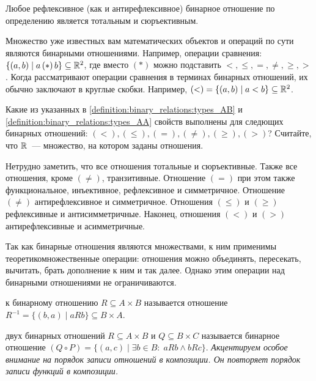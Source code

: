 \begin{remark}
    Любое рефлексивное (как и антирефлексивное) бинарное отношение по определению является тотальным и сюръективным.
\end{remark}

Множество уже известных вам математических объектов и операций по сути являются бинарными отношениями.
Например, операции сравнения: $ \{ (a, b) \mid a \, (*) \, b \} \subseteq \mathbb{R}^2 $, где вместо $ (*) $ можно подставить $ <, \leqslant, =, \neq, \geqslant, > $.
Когда рассматривают операции сравнения в терминах бинарных отношений, их обычно заключают в круглые скобки.
Например, $ (<) = \{ (a, b) \mid a < b \} \subseteq \mathbb{R}^2 $.

\begin{Exercise}[counter=SecExercise]
    \noindent
    Какие из указанных в \ref{definition:binary_relations:types_AB} и \ref{definition:binary_relations:types_AA}
    свойств выполнены для следющих бинарных отношений: $ (<), (\leqslant), (=), (\neq), (\geqslant), (>) $?
    Считайте, что $ \mathbb{R} $~--- множество, на котором заданы отношения.
\end{Exercise}

\begin{Answer}
    \noindent
    Нетрудно заметить, что все отношения тотальные и сюръективные.
    Также все отношения, кроме $ (\neq) $, транзитивные.
    Отношение $ (=) $ при этом также функциональное, инъективное, рефлексивное и симметричное.
    Отношение $ (\neq) $ антирефлексивное и симметричное.
    Отношения $ (\leqslant) $ и $ (\geqslant) $ рефлексивные и антисимметричные.
    Наконец, отношения $ (<) $ и $ (>) $ антирефлексивные и асимметричные.
\end{Answer}

Так как бинарные отношения являются множествами, к ним применимы теоретикомножественные операции:
отношения можно объединять, пересекать, вычитать, брать дополнение к ним и так далее.
Однако этим операции над бинарными отношениями не ограничиваются.

\begin{definition}
     к бинарному отношению $ R \subseteq A \times B $ называется отношение
    $ R^{-1} = \{(b, a) \mid a R b \} \subseteq B \times A $.
\end{definition}

\begin{definition}
     двух бинарных отношений $ R \subseteq A \times B $ и $ Q \subseteq B \times C $
    называется бинарное отношение $ (Q \circ P) = \{ (a, c) \mid \exists b \in B: \; a R b \wedge b R c \} $.
    \newline
    \textit{Акцентируем особое внимание на порядок записи отношений в композиции.
    Он повторяет порядок записи функций в композиции.}
\end{definition}

